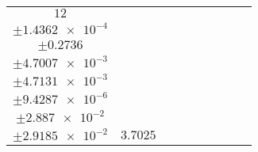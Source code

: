 \documentclass[8pt]{article}
\begin{document}
\begin{longtable}[l]{c c c c c c c c c}
$\num{12}$ & \begin{tabular}[c]{@{}c@{}}$\num{3.0528e-2}$ \\ $\pm\num{1.4362e-4}$\end{tabular} & \begin{tabular}[c]{@{}c@{}}$\num{0.34508}$ \\ $\pm\num{0.2736}$\end{tabular} & \begin{tabular}[c]{@{}c@{}}$\num{15.86}$ \\ $\pm\num{4.7007e-3}$\end{tabular} & \begin{tabular}[c]{@{}c@{}}$\num{1.4542e+3}$ \\ $\pm\num{4.7131e-3}$\end{tabular} & \begin{tabular}[c]{@{}c@{}}$\num{2.9092}$ \\ $\pm\num{9.4287e-6}$\end{tabular} & \begin{tabular}[c]{@{}c@{}}$\num{5.135}$ \\ $\pm\num{2.887e-2}$\end{tabular} & \begin{tabular}[c]{@{}c@{}}$\num{5.1788}$ \\ $\pm\num{2.9185e-2}$\end{tabular} & $\num{3.7025}$\\
\bottomrule
\end{longtable}
\end{document}
